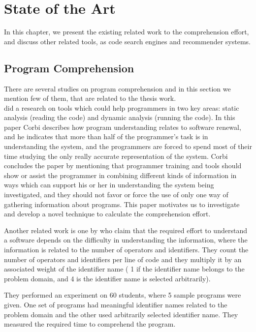 \documentclass[12pt,mscthesis]{usiinfthesis}
\begin{document}
\chapter{State of the Art}
	In this chapter, we present the existing related work to the comprehension effort, and discuss other related tools, as code search engines and recommender systems.
\section{Program Comprehension}
	There are several studies on program comprehension and in this section we mention few of them, that are related to the thesis work. \\


	\citet{Corbi:1989:PUC:97118.97124} did a research on tools which could help programmers in two key areas: static analysis (reading the code) and dynamic analysis (running the code). In this paper Corbi describes how program understanding relates to software renewal, and he indicates that more than half of the programmer's task is in understanding the system, and the programmers are forced to spend most of their time studying the only really accurate representation of the system.	Corbi concludes the paper by mentioning that programmer training and tools should show or assist the programmer in combining  different kinds of information in ways which can support his or her in understanding the system being investigated, and they should not favor or force the use of only one way of gathering information about programs.
	This paper motivates us to investigate and develop a novel technique to calculate the comprehension effort.
	\newpage

	Another related work is one by \citet{Kushwaha:2006:ICI:1163514.1163533}  who claim that the required effort to understand a software depends on the difficulty in understanding the information, where the information is related to the number of operators and identifiers. They count the number of operators and identifiers per line of code and they multiply it by an associated weight of the identifier name ( 1 if the identifier name belongs to the problem domain, and 4 is the identifier name is selected arbitrarily). 


	They performed an experiment on 60 students, where 5 sample programs were given. One set of programs had meaningful identifier names related to the problem domain and the other used arbitrarily selected identifier name. They measured the required time to comprehend the program.
\end{document}
